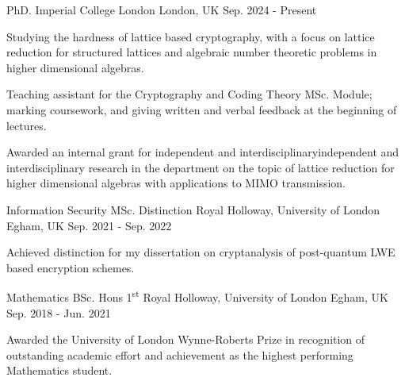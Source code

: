 


\begin{cventries}

\cventry
{PhD.} %
{Imperial College London} %
{London, UK} %
{Sep. 2024 - Present} %
{ %
\vspace{-4mm}
\begin{cvitems}
\item {Studying the hardness of lattice based cryptography, with a focus on lattice reduction for structured lattices and algebraic number theoretic problems in higher dimensional algebras.}
\item {Teaching assistant for the Cryptography and Coding Theory MSc. Module; marking coursework, and giving written and verbal feedback at the beginning of lectures.}
\item {Awarded an internal grant for independent and interdisciplinaryindependent and interdisciplinary research in the department on the topic of lattice reduction for higher dimensional algebras with applications to MIMO transmission.}
\end{cvitems}
\vspace{4mm}
}

\cventry
{Information Security MSc. Distinction} %
{Royal Holloway, University of London} %
{Egham, UK} %
{Sep. 2021 - Sep. 2022} %
{ %
\begin{cvitems}
\vspace{-4mm}
\item {Achieved distinction for my dissertation on cryptanalysis of post-quantum LWE based encryption schemes.}
\vspace{4mm}
\end{cvitems}
}

\cventry
{Mathematics BSc. Hons 1\textsuperscript{st}} %
{Royal Holloway, University of London} %
{Egham, UK} %
{Sep. 2018 - Jun. 2021} %
{ %
\begin{cvitems}
\vspace{-4mm}
\item {Awarded the University of London Wynne-Roberts Prize in recognition of outstanding academic effort and achievement as the highest performing Mathematics student.}
\vspace{4mm}
\end{cvitems}
}


\end{cventries}
